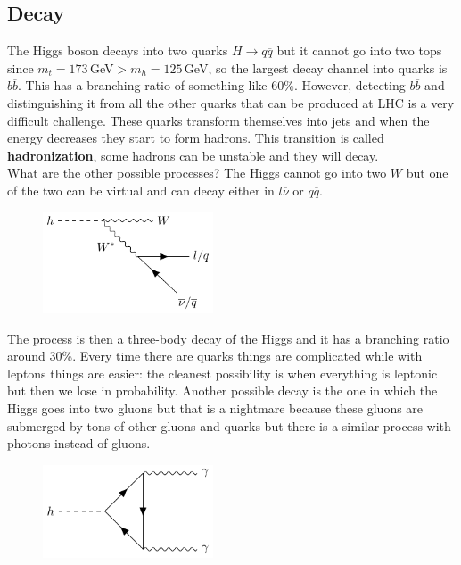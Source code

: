 \documentclass[../main.tex]{subfiles}
\begin{document}
\subsection{Decay}
The Higgs boson decays into two quarks $H\to q\overline{q}$ but it cannot go into two tops since $m_t=173$\,GeV$>m_h=125$\,GeV, so the largest decay channel into quarks is $b\overline{b}$. This has a branching ratio of something like 60\%. However, detecting $b\overline{b}$ and distinguishing it from all the other quarks that can be produced at LHC is a very difficult challenge. These quarks transform themselves into jets and when the energy decreases they start to form hadrons. This transition is called \textbf{hadronization}, some hadrons can be unstable and they will decay.\\
What are the other possible processes? The Higgs cannot go into two $W$ but one of the two can be virtual and can decay either in $l\overline{\nu}$ or $q\overline{q}$.
\begin{figure}[h]
    \centering
    \includegraphics[width=0.45\textwidth]{Images/hd1.pdf}
    \caption*{}
\end{figure}
\newpage
The process is then a three-body decay of the Higgs and it has a branching ratio around 30\%. Every time there are quarks things are complicated while with leptons things are easier: the cleanest possibility is when everything is leptonic but then we lose in probability. Another possible decay is the one in which the Higgs goes into two gluons but that is a nightmare because these gluons are submerged by tons of other gluons and quarks but there is a similar process with photons instead of gluons.
\begin{figure}[h]
    \centering
    \includegraphics[width=0.45\textwidth]{Images/hphotons.pdf}
    \caption*{}
\end{figure}\\
\end{document}
